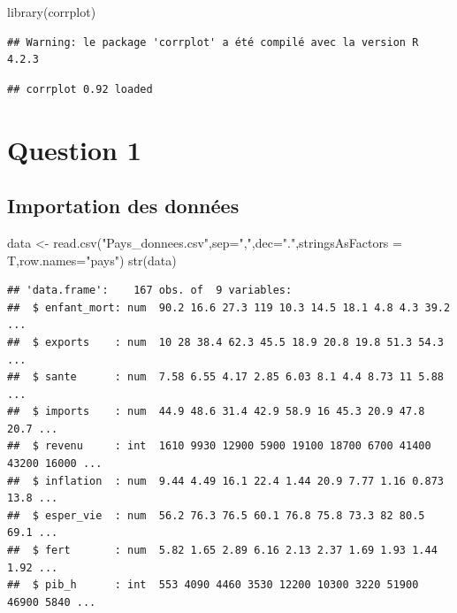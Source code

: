 \documentclass[
]{article}
\newenvironment{Shaded}{\begin{snugshade}}{\end{snugshade}}
\newcommand{\AttributeTok}[1]{\textcolor[rgb]{0.77,0.63,0.00}{#1}}
\newcommand{\FunctionTok}[1]{\textcolor[rgb]{0.00,0.00,0.00}{#1}}
\newcommand{\NormalTok}[1]{#1}
\newcommand{\OtherTok}[1]{\textcolor[rgb]{0.56,0.35,0.01}{#1}}
\newcommand{\StringTok}[1]{\textcolor[rgb]{0.31,0.60,0.02}{#1}}
\begin{document}
\begin{Shaded}
\begin{Highlighting}[]
\FunctionTok{library}\NormalTok{(corrplot)}
\end{Highlighting}
\end{Shaded}

\begin{verbatim}
## Warning: le package 'corrplot' a été compilé avec la version R 4.2.3
\end{verbatim}

\begin{verbatim}
## corrplot 0.92 loaded
\end{verbatim}

\hypertarget{question-1}{%
\section{Question 1}\label{question-1}}

\hypertarget{importation-des-donnuxe9es}{%
\subsection{Importation des données}\label{importation-des-donnuxe9es}}

\begin{Shaded}
\begin{Highlighting}[]
\NormalTok{data }\OtherTok{\textless{}{-}} \FunctionTok{read.csv}\NormalTok{(}\StringTok{"Pays\_donnees.csv"}\NormalTok{,}\AttributeTok{sep=}\StringTok{","}\NormalTok{,}\AttributeTok{dec=}\StringTok{"."}\NormalTok{,}\AttributeTok{stringsAsFactors =}\NormalTok{ T,}\AttributeTok{row.names=}\StringTok{"pays"}\NormalTok{)}
\FunctionTok{str}\NormalTok{(data)}
\end{Highlighting}
\end{Shaded}

\begin{verbatim}
## 'data.frame':    167 obs. of  9 variables:
##  $ enfant_mort: num  90.2 16.6 27.3 119 10.3 14.5 18.1 4.8 4.3 39.2 ...
##  $ exports    : num  10 28 38.4 62.3 45.5 18.9 20.8 19.8 51.3 54.3 ...
##  $ sante      : num  7.58 6.55 4.17 2.85 6.03 8.1 4.4 8.73 11 5.88 ...
##  $ imports    : num  44.9 48.6 31.4 42.9 58.9 16 45.3 20.9 47.8 20.7 ...
##  $ revenu     : int  1610 9930 12900 5900 19100 18700 6700 41400 43200 16000 ...
##  $ inflation  : num  9.44 4.49 16.1 22.4 1.44 20.9 7.77 1.16 0.873 13.8 ...
##  $ esper_vie  : num  56.2 76.3 76.5 60.1 76.8 75.8 73.3 82 80.5 69.1 ...
##  $ fert       : num  5.82 1.65 2.89 6.16 2.13 2.37 1.69 1.93 1.44 1.92 ...
##  $ pib_h      : int  553 4090 4460 3530 12200 10300 3220 51900 46900 5840 ...
\end{verbatim}
\end{document}
